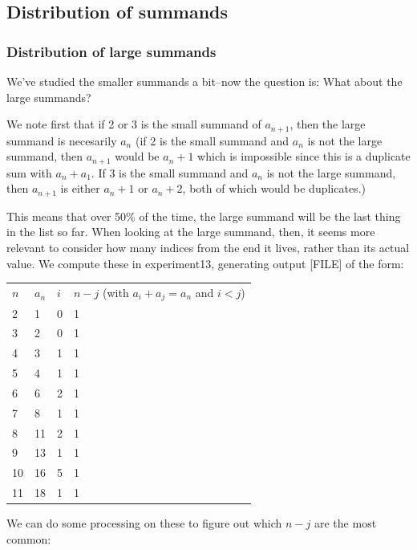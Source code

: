 \documentclass{article}
\theoremstyle{definition}
\theoremstyle{remark}
\numberwithin{equation}{section}
\begin{document}
{\color{red}

\subsection{Distribution of summands}

\subsubsection{Distribution of large summands}
We've studied the smaller summands a bit--now the question is: What
about the large summands?

We note first that if 2 or 3 is the small summand of $a_{n+1}$, then
the large summand is necesarily $a_n$ (if 2 is the small summand and
$a_n$ is not the large summand, then $a_{n+1}$ would be $a_n + 1$
which is impossible since this is a duplicate sum with $a_n+a_1$.  If
3 is the small summand and $a_n$ is not the large summand, then
$a_{n+1}$ is either $a_n + 1$ or $a_n + 2$, both of which would be
duplicates.)

This means that over 50\% of the time, the large summand will be the
last thing in the list so far.  When looking at the large summand,
then, it seems more relevant to consider how many indices from the end
it lives, rather than its actual value.  We compute these in
experiment13, generating output [FILE] of the form:

\begin{tabular}{|l|l|l|l|}
$n$ 	&$a_n$	&$i$	&$n-j$ (with $a_i + a_j = a_n$ and $i < j$)\\
2 	&1 	&0 	&1\\
3 	&2 	&0 	&1\\
4 	&3 	&1 	&1\\
5 	&4 	&1 	&1\\
6 	&6 	&2 	&1\\
7 	&8 	&1 	&1\\
8 	&11 	&2 	&1\\
9 	&13 	&1 	&1\\
10 	&16 	&5 	&1\\
11 	&18 	&1 	&1
\end{tabular}

We can do some processing on these to figure out which $n-j$ are the
most common:


}
\end{document}
